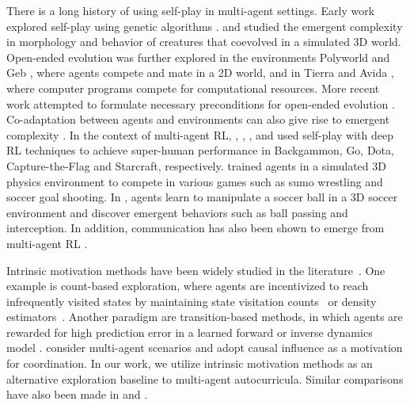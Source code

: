 There is a long history of using self-play in multi-agent settings.
Early work explored self-play using genetic algorithms \citep{paredis1995,pollack1997,rosin1995,stanley2004}. \cite{sims1994a} and \cite{sims1994b} studied the emergent complexity in morphology and behavior of creatures that coevolved in a simulated 3D world. Open-ended evolution was further explored in the environments Polyworld \citep{yaeger1994} and Geb \citep{channon1998}, where agents compete and mate in a 2D world, and in Tierra \citep{ray1992} and Avida \citep{ofria2004}, where computer programs compete for computational resources. More recent work attempted to formulate necessary preconditions for open-ended evolution \citep{taylor2015, soros2014}. 
Co-adaptation between agents and environments can also give rise to emergent complexity \citep{florensa2017reverse, sukhbaatar2017intrinsic, wang2019}.
In the context of multi-agent RL, \cite{tesauro1995}, \cite{silver2016}, \cite{openai2018}, \cite{Jaderberg859} and \cite{vinyals2019} used self-play with deep RL techniques to achieve super-human performance in Backgammon, Go, Dota, Capture-the-Flag and Starcraft, respectively.
\cite{bansal2017} trained agents in a simulated 3D physics environment to compete in various games such as sumo wrestling and soccer goal shooting.
In \cite{liu2019emergent}, agents learn to manipulate a soccer ball in a 3D soccer environment and discover emergent behaviors such as ball passing and interception. In addition, communication has also been shown to emerge from multi-agent RL \citep{sukhbaatar2016, foerster2016, lowe2017, mordatch2017}.

Intrinsic motivation methods have been widely studied in the literature~\citep{chentanez2005intrinsically,singh2010intrinsically}.
One example is count-based exploration, where agents are incentivized to reach infrequently visited states by maintaining state visitation counts~\citep{strehl2008analysis,bellemare2016unifying,tang2017exploration} or density estimators~\citep{ostrovski2017count,burda2018exploration}.
Another paradigm are transition-based methods, in which agents are rewarded for high prediction error in a learned forward or inverse dynamics model \citep{schmidhuber1991possibility, stadie2015incentivizing, mohamed2015variational, houthooft2016vime, achiam2017surprise, pathak2017curiosity, burda2018large, haber2018learning}.  \citet{jacques2019} consider multi-agent scenarios and adopt causal influence as a motivation for coordination.
In our work, we utilize intrinsic motivation methods as an alternative exploration baseline to multi-agent autocurricula. Similar comparisons have also been made in \cite{haber2018learning} and \cite{leibo2019malthusian}.

